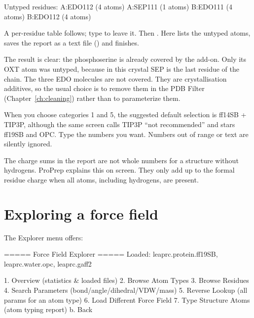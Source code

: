 \begin{steps}
\begin{screen}
Untyped residues:
  A:EDO112 (4 atoms)
  A:SEP111 (1 atoms)
  B:EDO111 (4 atoms)
  B:EDO112 (4 atoms)
\end{screen}
  \item A per-residue table follows; type  to leave it. Then
        . Here  lists the untyped atoms,  saves the
        report as a text file () and 
        finishes.
\end{steps}

The result is clear: the phosphoserine is already covered by the
 add-on. Only its OXT atom was untyped,
because in this crystal SEP is the last residue of the chain. The three EDO
molecules are not covered. They are crystallisation additives, so the usual
choice is to remove them in the PDB Filter (Chapter~\ref{ch:cleaning}) rather
than to parameterize them.

\begin{watchout}
When you choose categories 1 and 5, the suggested default selection is
ff14SB + TIP3P, although the same screen calls TIP3P ``not recommended'' and
stars ff19SB and OPC. Type the numbers you want. Numbers out of range or text
are silently ignored.
\end{watchout}

\begin{tip}
The charge sums in the report are not whole numbers for a structure without
hydrogens. ProPrep explains this on screen. They only add up to the formal
residue charge when all atoms, including hydrogens, are present.
\end{tip}

\section{Exploring a force field}
\label{sec:forcefields-explore}

The Explorer menu offers:

\begin{screen}
===== Force Field Explorer =====
Loaded: leaprc.protein.ff19SB, leaprc.water.opc, leaprc.gaff2

  1. Overview (statistics & loaded files)
  2. Browse Atom Types
  3. Browse Residues
  4. Search Parameters (bond/angle/dihedral/VDW/mass)
  5. Reverse Lookup (all params for an atom type)
  6. Load Different Force Field
  7. Type Structure Atoms (atom typing report)
  b. Back
\end{screen}

